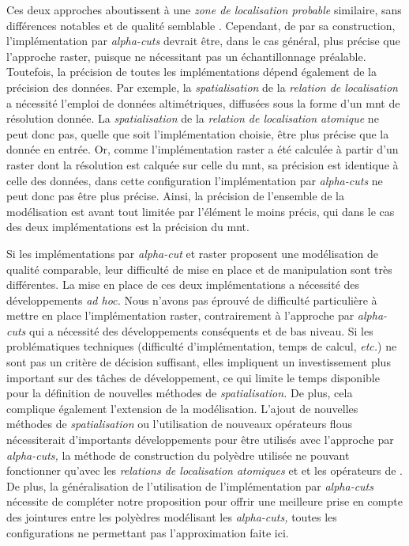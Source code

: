 Ces deux approches aboutissent à une \emph{zone de localisation
  probable} similaire, sans différences notables et de qualité
semblable \autocite{Bunel2019a}. Cependant, de par sa construction,
l'implémentation par \emph{alpha-cuts} devrait être, dans le cas
général, plus précise que l'approche raster, puisque ne nécessitant
pas un échantillonnage préalable. Toutefois, la précision de toutes
les implémentations dépend également de la précision des données. Par
exemple, la \emph{spatialisation} de la \emph{relation de
  localisation}  a nécessité l'emploi de
données altimétriques, diffusées sous la forme d'un \ac{mnt} de
résolution donnée. La \emph{spatialisation} de la \emph{relation de
  localisation atomique}
 ne peut
donc pas, quelle que soit l'implémentation choisie, être plus précise
que la donnée en entrée. Or, comme l'implémentation raster a été
calculée à partir d'un raster dont la résolution est calquée sur celle
du \ac{mnt}, sa précision est identique à celle des données, dans
cette configuration l'implémentation par \emph{alpha-cuts} ne peut
donc pas être plus précise. Ainsi, la précision de l'ensemble de la
modélisation est avant tout limitée par l'élément le moins précis, qui
dans le cas des deux implémentations est la précision du \ac{mnt}.


Si les implémentations par \emph{alpha-cut} et raster proposent une
modélisation de qualité comparable, leur difficulté de mise en place
et de manipulation sont très différentes. La mise en place de ces deux
implémentations a nécessité des développements \emph{ad hoc.} Nous
n'avons pas éprouvé de difficulté particulière à mettre en place
l'implémentation raster, contrairement à l'approche par
\emph{alpha-cuts} qui a nécessité des développements conséquents et de
bas niveau. Si les problématiques techniques (\eg difficulté
d'implémentation, temps de calcul, \emph{etc.}) ne sont pas un critère
de décision suffisant, elles impliquent un investissement plus
important sur des tâches de développement, ce qui limite le temps
disponible pour la définition de nouvelles méthodes de
\emph{spatialisation.} De plus, cela complique également l'extension
de la modélisation. L'ajout de nouvelles méthodes de
\emph{spatialisation} ou l'utilisation de nouveaux opérateurs flous
nécessiterait d'importants développements pour être utilisés avec
l'approche par \emph{alpha-cuts,} la méthode de construction du
polyèdre utilisée ne pouvant fonctionner qu'avec les \emph{relations
  de localisation atomiques}
 et
 et les opérateurs de \textcite{Zadeh1965}. De
plus, la généralisation de l'utilisation de l'implémentation par
\emph{alpha-cuts} nécessite de compléter notre proposition pour offrir
une meilleure prise en compte des jointures entre les polyèdres
modélisant les \emph{alpha-cuts,} toutes les configurations ne
permettant pas l'approximation faite ici.


